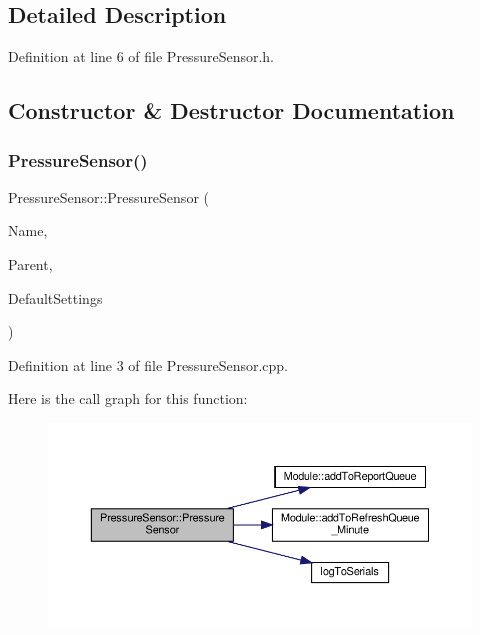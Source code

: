 \subsection{Detailed Description}


Definition at line 6 of file Pressure\+Sensor.\+h.



\subsection{Constructor \& Destructor Documentation}
\mbox{\label{class_pressure_sensor_a4eb0a9c44b5ebf1a1d932b8975e43b4b}} 
\subsubsection{\texorpdfstring{Pressure\+Sensor()}{PressureSensor()}\hspace{0.1cm}{\footnotesize\ttfamily [1/2]}}
{\footnotesize\ttfamily Pressure\+Sensor\+::\+Pressure\+Sensor (\begin{DoxyParamCaption}\item[{const \+\_\+\+\_\+\+Flash\+String\+Helper $\ast$}]{Name,  }\item[{\hyperlink{class_module}{Module} $\ast$}]{Parent,  }\item[{\hyperlink{struct_settings_1_1_pressure_sensor_settings}{Settings\+::\+Pressure\+Sensor\+Settings} $\ast$}]{Default\+Settings }\end{DoxyParamCaption})}



Definition at line 3 of file Pressure\+Sensor.\+cpp.

Here is the call graph for this function\+:
\nopagebreak
\begin{figure}[H]
\begin{center}
\leavevmode
\includegraphics[width=350pt]{class_pressure_sensor_a4eb0a9c44b5ebf1a1d932b8975e43b4b_cgraph}
\end{center}
\end{figure}
\mbox{\label{class_pressure_sensor_a4eb0a9c44b5ebf1a1d932b8975e43b4b}} 
